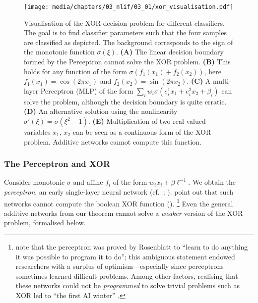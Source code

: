 \begin{figure}
	\centering
	\texttt{[image: media/chapters/03\_nlif/03\_01/xor\_visualisation.pdf]}%
	{\label{fig:xor_visualisation_a}}%
	{\label{fig:xor_visualisation_b}}%
	{\label{fig:xor_visualisation_c}}%
	{\label{fig:xor_visualisation_d}}%
	{\label{fig:xor_visualisation_e}}%
	\caption[Visualisation of the XOR decision problem for different classifiers]{Visualisation of the XOR decision problem for different classifiers. The goal is to find classifier parameters such that the four samples are classified as depicted.
	The background corresponds to the sign of the monotonic function $\sigma(\xi)$.
	\textbf{(A)} The linear decision boundary formed by the Perceptron cannot solve the XOR problem.
	\textbf{(B)} This holds for any function of the form $\sigma(f_1(x_1) + f_2(x_2))$, here $f_1(x_1) = \cos(2\pi x_1)$ and $f_2(x_2) = \sin(2\pi x_2)$.
	\textbf{(C)} A multi-layer Perceptron (MLP) of the form $\sum_i w_i \sigma(e_i^1 x_1 + e_i^2 x_2 + \beta_i )$ can solve the problem, although the decision boundary is quite erratic.
	\textbf{(D)} An alternative solution using the nonlinearity $\sigma'(\xi) = \sigma(\xi^2 - 1)$.
	\textbf{(E)} Multiplication of two real-valued variables $x_1$, $x_2$ can be seen as a continuous form of the XOR problem.
	Additive networks cannot compute this function.
	}
	\label{fig:xor_visualisation}
\end{figure}

\subsubsection{The Perceptron and XOR}
Consider monotonic $\sigma$ and affine $f_i$ of the form $w_i x_i + \beta \ell^{-1}$.
We obtain the \emph{perceptron}, an early single-layer neural network (cf.~; \cite{rosenblatt1958perceptron}).
 point out that such networks cannot compute the boolean XOR function ().%
\footnote{ note that the perceptron was proved by Rosenblatt to \enquote{learn to do anything it was possible to program it to do}; this ambiguous statement endowed researchers with a surplus of optimism---especially since perceptrons sometimes learned difficult problems.
Among other factors, realising that these networks could not be \emph{programmed} to solve trivial problems such as XOR led to \enquote{the first AI winter} \citep[e.g.,][]{muthukrishnan2020brief}.}
Even the general additive networks from our theorem cannot solve a \emph{weaker} version of the XOR problem, formalised below.


